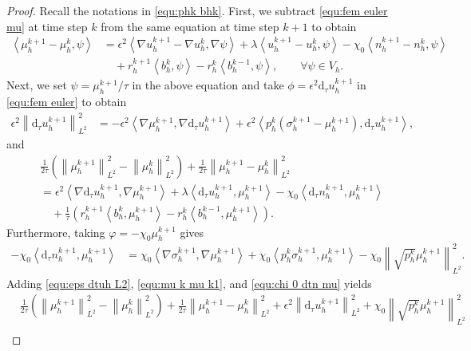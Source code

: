 \documentclass[11pt, reqno]{amsart}
\theoremstyle{definition}
\numberwithin{equation}{section}
\newcommand{\dtt}{\mathrm{d}_\tau}
\newcommand{\norm}[2]{\left\|{#1}\right\|_{#2}}
\newcommand{\inpro}[2]{\left\langle#1,#2\right\rangle}
\begin{document}
\begin{proof}
Recall the notations in \eqref{equ:phk bhk}.
First, we subtract \eqref{equ:fem euler mu} at time step $k$ from the same equation at time step $k+1$ to obtain
\begin{align*}
	\inpro{\mu_h^{k+1}-\mu_h^k}{\psi}
	&=
	\epsilon^2 \inpro{\nabla u_h^{k+1}-\nabla u_h^k}{\nabla \psi}
	+
	\lambda \inpro{u_h^{k+1}-u_h^k}{\psi}
	-
	\chi_0 \inpro{n_h^{k+1}-n_h^k}{\psi}
	\nonumber\\
	&\quad
	+
	r_h^{k+1} \inpro{b_h^k}{\psi}
	-
	r_h^k\inpro{b_h^{k-1}}{\psi}
	, \qquad \forall \psi\in V_h.
\end{align*}
Next, we set $\psi=\mu_h^{k+1}/\tau$ in the above equation and take $\phi=\epsilon^2 \dtt u_h^{k+1}$ in \eqref{equ:fem euler} to obtain
\begin{align}
	\label{equ:eps dtuh L2}
	\epsilon^2 \norm{\dtt u_h^{k+1}}{L^2}^2
	&=
	-\epsilon^2 \inpro{\nabla \mu_h^{k+1}}{\nabla \dtt u_h^{k+1}}
	+
	\epsilon^2 \inpro{p_h^k (\sigma_h^{k+1}-\mu_h^{k+1})}{\dtt u_h^{k+1}},
\end{align}
and
\begin{align} 
	\label{equ:mu k mu k1}
	&\frac{1}{2\tau} \left(\norm{\mu_h^{k+1}}{L^2}^2 - \norm{\mu_h^k}{L^2}^2\right) 
	+
	\frac{1}{2\tau} \norm{\mu_h^{k+1}-\mu_h^k}{L^2}^2
	\nonumber\\
	&=
	\epsilon^2 \inpro{\nabla\dtt u_h^{k+1}}{\nabla \mu_h^{k+1}}
	+
	\lambda \inpro{\dtt u_h^{k+1}}{\mu_h^{k+1}}
	-
	\chi_0 \inpro{\dtt n_h^{k+1}}{\mu_h^{k+1}}
	\nonumber\\
	&\quad
	+
	\frac{1}{\tau} \left(r_h^{k+1} \inpro{b_h^k}{\mu_h^{k+1}}
	-
	r_h^k \inpro{b_h^{k-1}}{\mu_h^{k+1}}\right).
\end{align}
Furthermore, taking $\varphi=-\chi_0 \mu_h^{k+1}$ gives
\begin{align}\label{equ:chi 0 dtn mu}
	-\chi_0 \inpro{\dtt n_h^{k+1}}{\mu_h^{k+1}}
	&=
	\chi_0 \inpro{\nabla \sigma_h^{k+1}}{\nabla \mu_h^{k+1}}
	+
	\chi_0 \inpro{p_h^k \sigma_h^{k+1}}{\mu_h^{k+1}}
	-
	\chi_0 \norm{\sqrt{p_h^k} \mu_h^{k+1}}{L^2}^2.
\end{align}
Adding \eqref{equ:eps dtuh L2}, \eqref{equ:mu k mu k1}, and \eqref{equ:chi 0 dtn mu} yields
\begin{align}\label{equ:mu k1 mu k}
	&\frac{1}{2\tau} \left(\norm{\mu_h^{k+1}}{L^2}^2 - \norm{\mu_h^k}{L^2}^2\right) 
	+
	\frac{1}{2\tau} \norm{\mu_h^{k+1}-\mu_h^k}{L^2}^2
	+
	\epsilon^2 \norm{\dtt u_h^{k+1}}{L^2}^2
	+
	\chi_0 \norm{\sqrt{p_h^k} \mu_h^{k+1}}{L^2}^2
	\nonumber\\

\end{align}
\end{proof}
\end{document}
